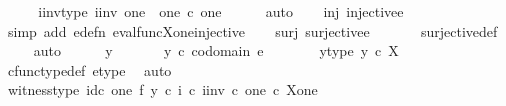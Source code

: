 \begin{isabellebody}
\ \ \isamarkupfalse%
\ \isamarkupfalse%
\ i{\isacharunderscore}{\kern0pt}inv{\isacharunderscore}{\kern0pt}type{\isacharcolon}{\kern0pt}\ {\isachardoublequoteopen}i{\isacharunderscore}{\kern0pt}inv{\isacharcolon}{\kern0pt}\ one{\isasymrightarrow}\ \ one\ {\isasymtimes}\isactrlsub c\ one{\isachardoublequoteclose}\isanewline
\ \ \ \ \isamarkupfalse%
\ auto\isanewline
\isanewline
\ \ \isamarkupfalse%
\ inj{\isacharcolon}{\kern0pt}\ {\isachardoublequoteopen}injective{\isacharparenleft}{\kern0pt}e{\isacharparenright}{\kern0pt}{\isachardoublequoteclose}\isanewline
\ \ \ \ \isamarkupfalse%
\ {\isacharparenleft}{\kern0pt}simp\ add{\isacharcolon}{\kern0pt}\ e{\isacharunderscore}{\kern0pt}defn\ eval{\isacharunderscore}{\kern0pt}func{\isacharunderscore}{\kern0pt}X{\isacharunderscore}{\kern0pt}one{\isacharunderscore}{\kern0pt}injective{\isacharparenright}{\kern0pt}\isanewline
\isanewline
\ \ \isamarkupfalse%
\ surj{\isacharcolon}{\kern0pt}\ {\isachardoublequoteopen}surjective{\isacharparenleft}{\kern0pt}e{\isacharparenright}{\kern0pt}{\isachardoublequoteclose}\isanewline
\ \ \ \ \ \isamarkupfalse%
\ surjective{\isacharunderscore}{\kern0pt}def\isanewline
\ \ \ \isamarkupfalse%
\ auto\isanewline
\ \ \ \ \isamarkupfalse%
\ y\ \isanewline
\ \ \ \ \isamarkupfalse%
\ {\isachardoublequoteopen}y\ {\isasymin}\isactrlsub c\ codomain\ e{\isachardoublequoteclose}\isanewline
\ \ \ \ \isamarkupfalse%
\ \isamarkupfalse%
\ y{\isacharunderscore}{\kern0pt}type{\isacharcolon}{\kern0pt}\ {\isachardoublequoteopen}y\ {\isasymin}\isactrlsub c\ X{\isachardoublequoteclose}\isanewline
\ \ \ \ \ \ \isamarkupfalse%
\ cfunc{\isacharunderscore}{\kern0pt}type{\isacharunderscore}{\kern0pt}def\ e{\isacharunderscore}{\kern0pt}type\ \isamarkupfalse%
\ auto\isanewline
\isanewline
\ \ \ \ \isamarkupfalse%
\ witness{\isacharunderscore}{\kern0pt}type{\isacharcolon}{\kern0pt}\ {\isachardoublequoteopen}{\isacharparenleft}{\kern0pt}id\isactrlsub c\ one\ {\isasymtimes}\isactrlsub f\ {\isacharparenleft}{\kern0pt}y\ {\isasymcirc}\isactrlsub c\ i{\isacharparenright}{\kern0pt}\isactrlsup {\isasymsharp}{\isacharparenright}{\kern0pt}\ {\isasymcirc}\isactrlsub c\ i{\isacharunderscore}{\kern0pt}inv\ {\isasymin}\isactrlsub c\ one\ {\isasymtimes}\isactrlsub c\ X\isactrlbsup one\isactrlesup {\isachardoublequoteclose}\isanewline
\ \ \ \ \ \ \isamarkupfalse%

\end{isabellebody}
